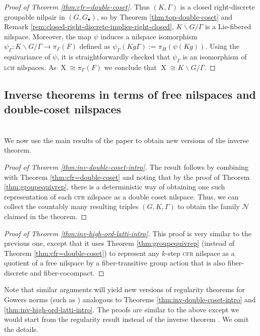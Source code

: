 \documentclass[a4paper,12pt,reqno]{amsart}
\theoremstyle{definition}
\def\to{\rightarrow}
\newcommand{\mc}{\mathcal}
\DeclareMathOperator{\ns}{X}
\begin{document}
\begin{proof}[Proof of Theorem \ref{thm:cfr=double-coset}]
Thus $(K,\Gamma)$ is a closed right-discrete groupable nilpair in $(G,G_\bullet)$, so by Theorem \ref{thm:top-double-coset} and Remark \ref{rem:closed-right-discrete-implies-right-closed}, $K\backslash G / \Gamma$ is a Lie-fibered nilspace. Moreover, the map $\psi$ induces a nilspace isomorphism $\psi_\Gamma:K\backslash G/\Gamma \to \pi_\Gamma(F)$ defined as $\psi_\Gamma(Kg\Gamma):=\pi_H(\psi(Kg))$. Using the equivariance of $\psi$, it is straightforwardly checked that $\psi_\Gamma$ is an isomorphism of \textsc{lch} nilspaces. As $\ns\cong \pi_\Gamma(F)$ we conclude that $\ns\cong K\backslash G /\Gamma$.
\end{proof}

\subsection{Inverse theorems in terms of free nilspaces and double-coset nilspaces}\hfill\smallskip\\
\noindent We now use the main results of the paper to obtain new versions of the inverse theorem.
\begin{proof}[Proof of Theorem \ref{thm:inv-double-coset-intro}]
The result follows by combining \cite[Theorem 1.6]{CSinverse}  with Theorem \ref{thm:cfr=double-coset} and noting that by the proof of Theorem \ref{thm:groupequivrep}, there is a deterministic way of obtaining one such representation of each \textsc{cfr} nilspace as a double coset nilspace. Thus, we can collect the countably many resulting triples $(G,K,\Gamma)$ to obtain the family $\mc{N}$ claimed in the theorem.
\end{proof}

\begin{proof}[Proof of Theorem \ref{thm:inv-high-ord-latti-intro}]
This proof is very similar to the previous one, except that it uses Theorem \ref{thm:groupequivrep} (instead of Theorem \ref{thm:cfr=double-coset}) to represent any $k$-step \textsc{cfr} nilspace as a quotient of a free nilspace by a fiber-transitive group action that is also fiber-discrete and fiber-cocompact. 
\end{proof}
\noindent Note that similar arguments will yield new versions of  regularity theorems for Gowers norms (such as \cite[Theorem 1.5]{CSinverse}) analogous to Theorems \ref{thm:inv-double-coset-intro} and \ref{thm:inv-high-ord-latti-intro}. The proofs are  similar to the above except we would start from the regularity result \cite[Theorem 1.5]{CSinverse} instead of the inverse theorem \cite[Theorem 1.6]{CSinverse}. We omit the details.
\end{document}

